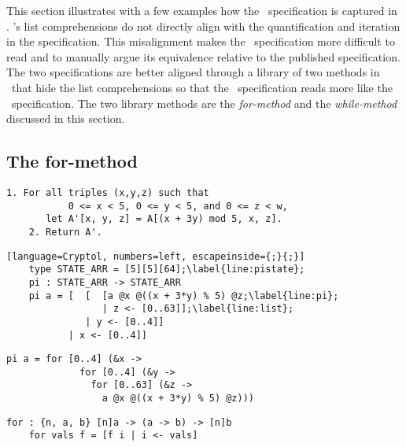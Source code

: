 This section illustrates with a few examples how the \fips\ specification is captured in \cryptol. 
\cryptol's list comprehensions do not directly align with the quantification and iteration in the specification. 
This misalignment makes the \cryptol\ specification more difficult to read and to manually argue its equivalence relative to the published specification.
The two specifications are better aligned through a library of two methods in \cryptol\ that hide the list comprehensions so that the \cryptol\ specification reads more like the \fips\ specification. The two library methods are the \emph{for-method} and the \emph{while-method} discussed in this section.

\subsection{The for-method}

\newsavebox{\fipsPi}
\begin{lrbox}{\fipsPi}
  \begin{lstlisting}[basewidth = {.5em},basicstyle={\small}]
    1. For all triples (x,y,z) such that 
           0 <= x < 5, 0 <= y < 5, and 0 <= z < w,
       let A'[x, y, z] = A[(x + 3y) mod 5, x, z].
    2. Return A'.
  \end{lstlisting}
\end{lrbox}

\newsavebox{\PiCry}
\begin{lrbox}{\PiCry}
  \begin{lstlisting}[language=Cryptol, numbers=left, escapeinside={;}{;}]
    type STATE_ARR = [5][5][64];\label{line:pistate};
    pi : STATE_ARR -> STATE_ARR
    pi a = [  [  [a @x @((x + 3*y) % 5) @z;\label{line:pi};
                 | z <- [0..63]];\label{line:list};
              | y <- [0..4]] 
           | x <- [0..4]]
  \end{lstlisting}
\end{lrbox}

\newsavebox{\PiCryLib}
\begin{lrbox}{\PiCryLib}
  \begin{lstlisting}[language=Cryptol]
    pi a = for [0..4] (&x ->
             for [0..4] (&y -> 
               for [0..63] (&z -> 
                 a @x @((x + 3*y) % 5) @z)))
  \end{lstlisting}
\end{lrbox}

\newsavebox{\formethod}
\begin{lrbox}{\formethod}
  \begin{lstlisting}[language=Cryptol]
    for : {n, a, b} [n]a -> (a -> b) -> [n]b
    for vals f = [f i | i <- vals]
  \end{lstlisting}
\end{lrbox}

